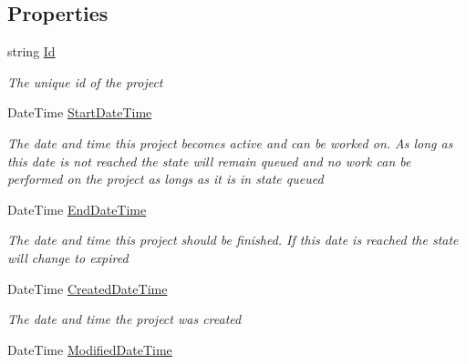\subsection*{Properties}
\begin{DoxyCompactItemize}
\item 
string \hyperlink{class_plex_byte_1_1_mo_cap_1_1_interactions_1_1_project_ad78c8f3d9736e6c9dccb1d0e0a0748f7}{Id}
\begin{DoxyCompactList}\small\item\em The unique id of the project \end{DoxyCompactList}\item 
Date\+Time \hyperlink{class_plex_byte_1_1_mo_cap_1_1_interactions_1_1_project_ab1d85e04faa4f114a466abf8f238b7d5}{Start\+Date\+Time}
\begin{DoxyCompactList}\small\item\em The date and time this project becomes active and can be worked on. As long as this date is not reached the state will remain queued and no work can be performed on the project as longs as it is in state queued \end{DoxyCompactList}\item 
Date\+Time \hyperlink{class_plex_byte_1_1_mo_cap_1_1_interactions_1_1_project_a12da623278dc598539d16694aab4f136}{End\+Date\+Time}
\begin{DoxyCompactList}\small\item\em The date and time this project should be finished. If this date is reached the state will change to expired \end{DoxyCompactList}\item 
Date\+Time \hyperlink{class_plex_byte_1_1_mo_cap_1_1_interactions_1_1_project_a9d79cd9f19fef0e610933a19e5cdc099}{Created\+Date\+Time}
\begin{DoxyCompactList}\small\item\em The date and time the project was created \end{DoxyCompactList}\item 
Date\+Time \hyperlink{class_plex_byte_1_1_mo_cap_1_1_interactions_1_1_project_a5f3569713936103ba32da4338094a787}{Modified\+Date\+Time}

\end{DoxyCompactItemize}
